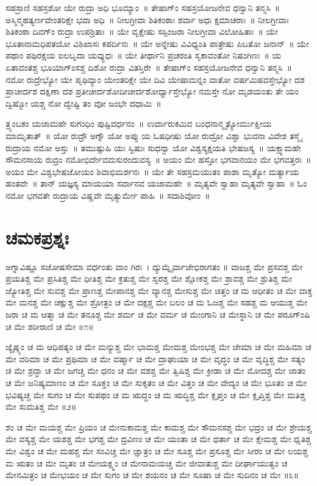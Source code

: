 ಸಹಸ್ರಾಣಿ ಸಹಸ್ರಶೋ ಯೇ ರುದ್ರಾ ಅಧಿ ಭೂಮ್ಯಾಂ~॥
ತೇಷಾಗ್ಂ ಸಹಸ್ರಯೋಜನೇವ ಧನ್ವಾನಿ ತನ್ಮಸಿ~॥
ಅಸ್ಮಿನ್ಮಹತ್ಯರ್ಣವೇಂತರಿಕ್ಷೇ ಭವಾ ಅಧಿ~॥
ನೀಲಗ್ರೀವಾ ಶಿತಿಕಂಠಾಃ ಶರ್ವಾ ಅಧಃ ಕ್ಷಮಾಚರಾಃ~॥
ನೀಲಗ್ರೀವಾಃ ಶಿತಿಕಂಠಾ ದಿವಗ್ಂ ರುದ್ರಾ ಉಪಶ್ರಿತಾಃ~॥
ಯೇ ವೃಕ್ಷೇಷು ಸಸ್ಪಿಂಜರಾ ನೀಲಗ್ರೀವಾ ವಿಲೋಹಿತಾಃ~॥
ಯೇ ಭೂತಾನಾಮಧಿಪತಯೋ ವಿಶಿಖಾಸಃ ಕಪರ್ದಿನಃ~॥
ಯೇ ಅನ್ನೇಷು ವಿವಿಧ್ಯಂತಿ ಪಾತ್ರೇಷು ಪಿಬತೋ ಜನಾನ್~॥
ಯೇ ಪಥಾಂ ಪಥಿರಕ್ಷಯ ಐಲಬೃದಾ ಯವ್ಯುಧಃ~॥
ಯೇ ತೀರ್ಥಾನಿ ಪ್ರಚರಂತಿ ಸೃಕಾವಂತೋ ನಿಷಂಗಿಣಃ~॥
ಯ ಏತಾವಂತಶ್ಚ ಭೂಯಾಗ್ಂಸಶ್ಚ ದಿಶೋ ರುದ್ರಾ ವಿತಸ್ತಿರೇ~॥
ತೇಷಾಗ್ಂ ಸಹಸ್ರಯೋಜನೇವ ಧನ್ವಾನಿ ತನ್ಮಸಿ~॥\\
ನಮೋ ರುದ್ರೇಭ್ಯೋ ಯೇ ಪೃಥಿವ್ಯಾಂ ಯೇಂತರಿಕ್ಷೇ ಯೇ ದಿವಿ ಯೇಷಾಮನ್ನಂ ವಾತೋ ವರ್ಷಮಿಷವಸ್ತೇಭ್ಯೋ ದಶ ಪ್ರಾಚೀರ್ದಶ ದಕ್ಷಿಣಾ ದಶ ಪ್ರತೀಚೀರ್ದಶೋದೀಚೀರ್ದಶೋರ್ಧ್ವಾಸ್ತೇಭ್ಯೋ ನಮಸ್ತೇ ನೋ ಮೃಡಯಂತು ತೇ ಯಂ ದ್ವಿಷ್ಮೋ ಯಶ್ಚ ನೋ ದ್ವೇಷ್ಟಿ ತಂ ವೋ ಜಂಭೇ ದಧಾಮಿ~॥

ತ್ರ್ಯಂಬಕಂ ಯಜಾಮಹೇ ಸುಗಂಧಿಂ ಪುಷ್ಟಿವರ್ಧನಂ~॥
ಉರ್ವಾರುಕಮಿವ ಬಂಧನಾನ್ಮೃತ್ಯೋರ್ಮುಕ್ಷೀಯ ಮಾಮೃತಾತ್~॥
ಯೋ ರುದ್ರೌ ಅಗ್ನೌ ಯೋ ಅಪ್ಸು ಯ ಓಷಧೀಷು ಯೋ ರುದ್ರೋ ವಿಶ್ವಾ ಭುವನಾ ವಿವೇಶ ತಸ್ಮೈ ರುದ್ರಾಯ ನಮೋ ಅಸ್ತು~॥
ತಮುಷ್ಟುಹಿ ಯಃ ಸ್ವಿಷುಃ ಸುಧನ್ವಾ ಯೋ ವಿಶ್ವಸ್ಯಕ್ಷಯತಿ ಭೇಷಜಸ್ಯ~॥
ಯಕ್ಷ್ವಾಮಹೇ ಸೌಮನಸಾಯ ರುದ್ರಂ ನಮೋಭಿರ್ದೇವಮಸುರಂದುವಸ್ಯ~॥
ಅಯಂ ಮೇ ಹಸ್ತೋ ಭಗವಾನಯಂ ಮೇ ಭಗವತ್ತರಃ~॥
ಅಯಂ ಮೇ ವಿಶ್ವಭೇಷಜೋಯಂ ಶಿವಾಭಿಮರ್ಶನಃ~॥
ಯೇ ತೇ ಸಹಸ್ರಮಯುತಂ ಪಾಶಾ ಮೃತ್ಯೋ ಮರ್ತ್ಯಾಯ ಹಂತವೇ~॥
ತಾನ್ ಯಜ್ಞಸ್ಯ ಮಾಯಯಾ ಸರ್ವಾನವ ಯಜಾಮಹೇ~॥
ಮೃತ್ಯವೇ ಸ್ವಾಹಾ ಮೃತ್ಯವೇ ಸ್ವಾಹಾ~॥
ಓಂ ನಮೋ ಭಗವತೇ ರುದ್ರಾಯ ವಿಷ್ಣವೇ ಮೃತ್ಯುರ್ಮೇ ಪಾಹಿ~॥ ಸದಾಶಿವೋಂ~॥
\section{ಚಮಕಪ್ರಶ್ನಃ }
ಅಗ್ನಾವಿಷ್ಣೂ ಸಜೋಷಸೇಮಾ ವರ್ಧಂತು ವಾಂ ಗಿರಃ~। ದ್ಯುಮ್ನೈರ್ವಾಜೇಭಿರಾಗತಂ ॥ ವಾಜಶ್ಚ ಮೇ ಪ್ರಸವಶ್ಚ ಮೇ ಪ್ರಯತಿಶ್ಚ ಮೇ ಪ್ರಸಿತಿಶ್ಚ ಮೇ ಧೀತಿಶ್ಚ ಮೇ ಕ್ರತುಶ್ಚ ಮೇ ಸ್ವರಶ್ಚ ಮೇ ಶ್ಲೋಕಶ್ಚ ಮೇ ಶ್ರಾವಶ್ಚ ಮೇ ಶ್ರುತಿಶ್ಚ ಮೇ ಜ್ಯೋತಿಶ್ಚ ಮೇ ಸುವಶ್ಚ ಮೇ ಪ್ರಾಣಶ್ಚ ಮೇಪಾನಶ್ಚ ಮೇ ವ್ಯಾನಶ್ಚ ಮೇಸುಶ್ಚ ಮೇ ಚಿತ್ತಂ ಚ ಮ ಆಧೀತಂ ಚ ಮೇ ವಾಕ್ಚ ಮೇ ಮನಶ್ಚ ಮೇ ಚಕ್ಷುಶ್ಚ ಮೇ ಶ್ರೋತ್ರಂ ಚ ಮೇ ದಕ್ಷಶ್ಚ ಮೇ ಬಲಂ ಚ ಮ ಓಜಶ್ಚ ಮೇ ಸಹಶ್ಚ ಮ ಆಯುಶ್ಚ ಮೇ ಜರಾ ಚ ಮ ಆತ್ಮಾ ಚ ಮೇ ತನೂಶ್ಚ ಮೇ ಶರ್ಮ ಚ ಮೇ ವರ್ಮ ಚ ಮೇಂಗಾನಿ ಚ ಮೇಸ್ಥಾನಿ ಚ ಮೇ ಪರೂಗ್ಂಷಿ ಚ ಮೇ ಶರೀರಾಣಿ ಚ ಮೇ ॥೧॥

ಜ್ಯೈಷ್ಠ್ಯಂ ಚ ಮ ಆಧಿಪತ್ಯಂ ಚ ಮೇ ಮನ್ಯುಶ್ಚ ಮೇ ಭಾಮಶ್ಚ ಮೇಮಶ್ಚ ಮೇಂಭಶ್ಚ ಮೇ ಜೇಮಾ ಚ ಮೇ ಮಹಿಮಾ ಚ ಮೇ ವರಿಮಾ ಚ ಮೇ ಪ್ರಥಿಮಾ ಚ ಮೇ ವರ್ಷ್ಮಾ ಚ ಮೇ ದ್ರಾಘುಯಾ ಚ ಮೇ ವೃದ್ಧಂ ಚ ಮೇ ವೃದ್ಧಿಶ್ಚ ಮೇ ಸತ್ಯಂ ಚ ಮೇ ಶ್ರದ್ಧಾ ಚ ಮೇ ಜಗಚ್ಚ ಮೇ ಧನಂ ಚ ಮೇ ವಶಶ್ಚ ಮೇ ತ್ವಿಷಿಶ್ಚ ಮೇ ಕ್ರೀಡಾ ಚ ಮೇ ಮೋದಶ್ಚ ಮೇ ಜಾತಂ ಚ ಮೇ ಜನಿಷ್ಯಮಾಣಂ ಚ ಮೇ ಸೂಕ್ತಂ ಚ ಮೇ ಸುಕೃತಂ ಚ ಮೇ ವಿತ್ತಂ ಚ ಮೇ ವೇದ್ಯಂ ಚ ಮೇ ಭೂತಂ ಚ ಮೇ ಭವಿಷ್ಯಚ್ಚ ಮೇ ಸುಗಂ ಚ ಮೇ ಸುಪಥಂ ಚ ಮ ಋದ್ಧಂ ಚ ಮ ಋದ್ಧಿಶ್ಚ ಮೇ ಕ್ಲೃಪ್ತಂ ಚ ಮೇ ಕ್ಲೃಪ್ತಿಶ್ಚ ಮೇ ಮತಿಶ್ಚ ಮೇ ಸುಮತಿಶ್ಚ ಮೇ ॥೨॥

ಶಂ ಚ ಮೇ ಮಯಶ್ಚ ಮೇ ಪ್ರಿಯಂ ಚ ಮೇನುಕಾಮಶ್ಚ ಮೇ ಕಾಮಶ್ಚ ಮೇ ಸೌಮನಸಶ್ಚ ಮೇ ಭದ್ರಂ ಚ ಮೇ ಶ್ರೇಯಶ್ಚ ಮೇ ವಸ್ಯಶ್ಚ ಮೇ ಯಶಶ್ಚ ಮೇ ಭಗಶ್ಚ ಮೇ ದ್ರವಿಣಂ ಚ ಮೇ ಯಂತಾ ಚ ಮೇ ಧರ್ತಾ ಚ ಮೇ ಕ್ಷೇಮಶ್ಚ ಮೇ ಧೃತಿಶ್ಚ ಮೇ ವಿಶ್ವಂ ಚ ಮೇ ಮಹಶ್ಚ ಮೇ ಸಂವಿಚ್ಚ ಮೇ ಜ್ಞಾತ್ರಂ ಚ ಮೇ ಸೂಶ್ಚ ಮೇ ಪ್ರಸೂಶ್ಚ ಮೇ ಸೀರಂ ಚ ಮೇ ಲಯಶ್ಚ ಮ ಋತಂ ಚ ಮೇ ಮೃತಂ ಚ ಮೇಯಕ್ಷ್ಮಂ ಚ ಮೇನಾಮಯಚ್ಚ ಮೇ ಜೀವಾತುಶ್ಚ ಮೇ ದೀರ್ಘಾಯುತ್ವಂ ಚ ಮೇನಮಿತ್ರಂ ಚ ಮೇಭಯಂ ಚ ಮೇ ಸುಗಂ ಚ ಮೇ ಶಯನಂ ಚ ಮೇ ಸೂಷಾ ಚ ಮೇ ಸುದಿನಂ ಚ ಮೇ ॥೩॥

